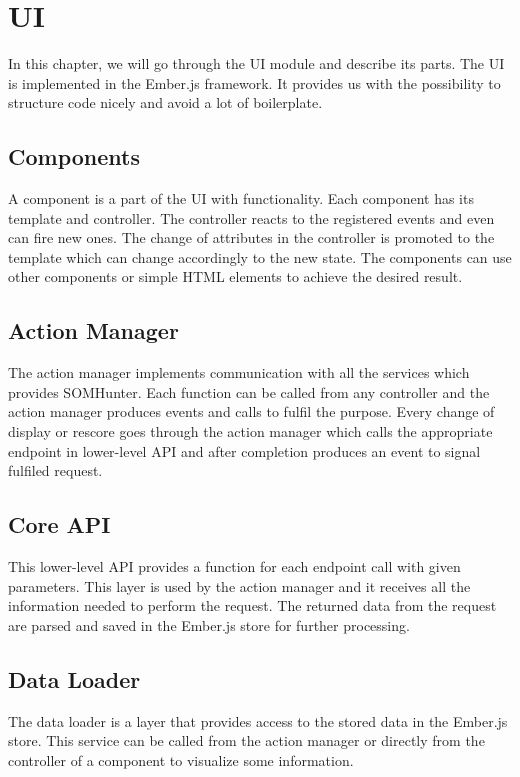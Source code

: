 \chapter{UI}
\label{comp-ui}

In this chapter, we will go through the UI module and describe its parts. The UI is implemented in the Ember.js framework. It provides us with the possibility to structure code nicely and avoid a lot of boilerplate.

\section{Components}

A component is a part of the UI with functionality. Each component has its template and controller. The controller reacts to the registered events and even can fire new ones. The change of attributes in the controller is promoted to the template which can change accordingly to the new state. The components can use other components or simple HTML elements to achieve the desired result. 

\section{Action Manager}

The action manager implements communication with all the services which provides SOMHunter. Each function can be called from any controller and the action manager produces events and calls to fulfil the purpose. Every change of display or rescore goes through the action manager which calls the appropriate endpoint in lower-level API and after completion produces an event to signal fulfiled request.

\section{Core API}

This lower-level API provides a function for each endpoint call with given parameters. This layer is used by the action manager and it receives all the information needed to perform the request. The returned data from the request are parsed and saved in the Ember.js store for further processing.

\section{Data Loader}

The data loader is a layer that provides access to the stored data in the Ember.js store. This service can be called from the action manager or directly from the controller of a component to visualize some information.
